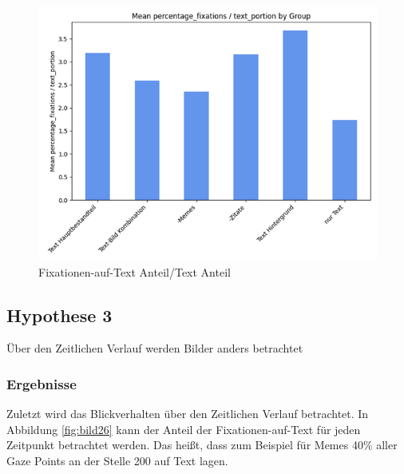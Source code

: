 \documentclass[
    language=german, %
    thesis=seminar, %
    supervisor=postdoc, %
    multiauthor=true, %
    ]{settings/csssa-thesis}
\begin{document}
\begin{figure}[h]
    \centering
    \includegraphics[width=\linewidth,height=0.8\textheight,keepaspectratio]{figures/Bild30.png}
    \caption{Fixationen-auf-Text Anteil/Text Anteil}\label{fig:bild25}
\end{figure}

\subsection{Hypothese 3}
Über den Zeitlichen Verlauf werden Bilder anders betrachtet

\subsubsection{Ergebnisse}
Zuletzt wird das Blickverhalten über den Zeitlichen Verlauf betrachtet. In Abbildung \ref{fig:bild26} kann der 
Anteil der Fixationen-auf-Text für jeden Zeitpunkt betrachtet werden. Das heißt, dass zum Beispiel 
für Memes 40\% aller Gaze Points an der Stelle 200 auf Text lagen. 
\end{document}
